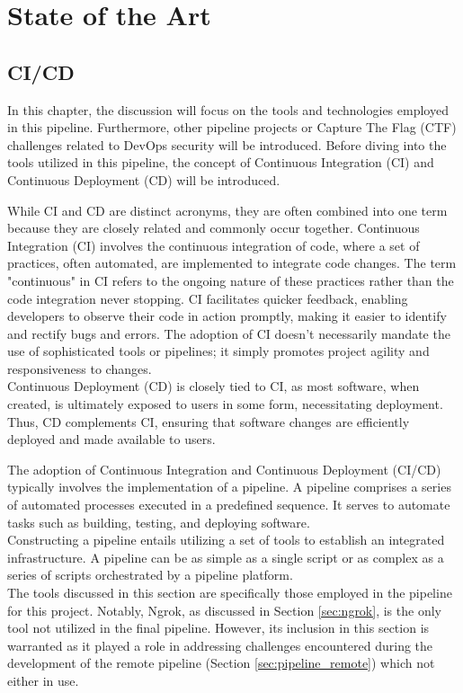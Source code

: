\chapter{State of the Art}

\section*{\ac{CI/CD}}
In this chapter, the discussion will focus on the tools and technologies employed in this pipeline. 
Furthermore, other pipeline projects or Capture The Flag (CTF) challenges related to DevOps security will be introduced. 
Before diving into the tools utilized in this pipeline, 
the concept of Continuous Integration (\ac{CI}) and Continuous Deployment (\ac{CD}) will be introduced.

While \ac{CI} and \ac{CD} are distinct acronyms, they are often combined into one term because they are closely related and commonly occur together.
Continuous Integration (\ac{CI}) involves the continuous integration of code, where a set of practices, often automated, 
are implemented to integrate code changes. The term "continuous" in \ac{CI} refers to the ongoing nature of these practices 
rather than the code integration never stopping. \ac{CI} facilitates quicker feedback, 
enabling developers to observe their code in action promptly, making it easier to identify and rectify bugs and errors. 
The adoption of \ac{CI} doesn't necessarily mandate the use of sophisticated tools or pipelines; 
it simply promotes project agility and responsiveness to changes.\\
Continuous Deployment (\ac{CD}) is closely tied to \ac{CI}, as most software, when created, is ultimately exposed 
to users in some form, necessitating deployment. Thus, \ac{CD} complements \ac{CI}, ensuring that software changes 
are efficiently deployed and made available to users.\cite{duvall2007continuous}

The adoption of Continuous Integration and Continuous Deployment (\ac{CI/CD}) 
typically involves the implementation of a pipeline. A pipeline comprises a series of automated 
processes executed in a predefined sequence. It serves to automate tasks such as building, testing, and deploying software.\\
Constructing a pipeline entails utilizing a set of tools to establish an integrated infrastructure.
A pipeline can be as simple as a single script or as complex as a series of scripts orchestrated by a pipeline platform.\\
The tools discussed in this section are specifically those employed in the pipeline for this project. 
Notably, Ngrok, as discussed in Section \ref{sec:ngrok}, is the only tool not utilized in the final pipeline. 
However, its inclusion in this section is warranted as it played a role in addressing 
challenges encountered during the development of the remote pipeline (Section \ref{sec:pipeline_remote}) which not either in use.

